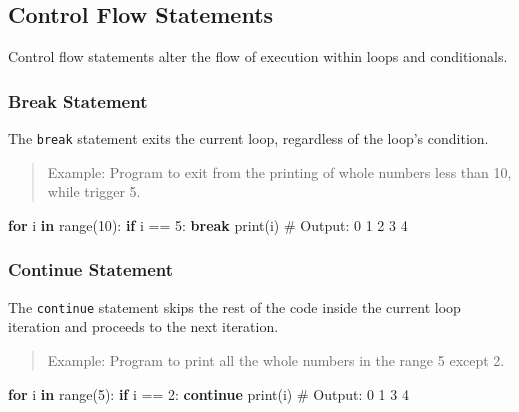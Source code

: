 \documentclass[
  letterpaper,
  DIV=11,
  numbers=noendperiod]{scrreprt}
\newenvironment{Shaded}{\begin{snugshade}}{\end{snugshade}}
\newcommand{\BuiltInTok}[1]{\textcolor[rgb]{0.00,0.23,0.31}{#1}}
\newcommand{\CommentTok}[1]{\textcolor[rgb]{0.37,0.37,0.37}{#1}}
\newcommand{\ControlFlowTok}[1]{\textcolor[rgb]{0.00,0.23,0.31}{\textbf{#1}}}
\newcommand{\DecValTok}[1]{\textcolor[rgb]{0.68,0.00,0.00}{#1}}
\newcommand{\KeywordTok}[1]{\textcolor[rgb]{0.00,0.23,0.31}{\textbf{#1}}}
\newcommand{\NormalTok}[1]{\textcolor[rgb]{0.00,0.23,0.31}{#1}}
\newcommand{\OperatorTok}[1]{\textcolor[rgb]{0.37,0.37,0.37}{#1}}
\theoremstyle{plain}
\theoremstyle{definition}
\theoremstyle{remark}
\begin{document}
\subsection{Control Flow Statements}\label{control-flow-statements}

Control flow statements alter the flow of execution within loops and
conditionals.

\subsubsection{Break Statement}\label{break-statement}

The \texttt{break} statement exits the current loop, regardless of the
loop's condition.

\begin{quote}
Example: Program to exit from the printing of whole numbers less than
10, while trigger 5.
\end{quote}

\begin{Shaded}
\begin{Highlighting}[]
\ControlFlowTok{for}\NormalTok{ i }\KeywordTok{in} \BuiltInTok{range}\NormalTok{(}\DecValTok{10}\NormalTok{):}
    \ControlFlowTok{if}\NormalTok{ i }\OperatorTok{==} \DecValTok{5}\NormalTok{:}
        \ControlFlowTok{break}
    \BuiltInTok{print}\NormalTok{(i)}
\CommentTok{\# Output: 0 1 2 3 4}
\end{Highlighting}
\end{Shaded}

\subsubsection{Continue Statement}\label{continue-statement}

The \texttt{continue} statement skips the rest of the code inside the
current loop iteration and proceeds to the next iteration.

\begin{quote}
Example: Program to print all the whole numbers in the range 5 except 2.
\end{quote}

\begin{Shaded}
\begin{Highlighting}[]
\ControlFlowTok{for}\NormalTok{ i }\KeywordTok{in} \BuiltInTok{range}\NormalTok{(}\DecValTok{5}\NormalTok{):}
    \ControlFlowTok{if}\NormalTok{ i }\OperatorTok{==} \DecValTok{2}\NormalTok{:}
        \ControlFlowTok{continue}
    \BuiltInTok{print}\NormalTok{(i) }
\CommentTok{\# Output: 0 1 3 4}
\end{Highlighting}
\end{Shaded}
\end{document}

